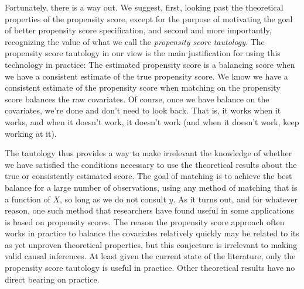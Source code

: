 \documentclass[11pt,titlepage]{article}
\begin{document}
Fortunately, there is a way out.  We suggest, first, looking past the
theoretical properties of the propensity score, except for the purpose
of motivating the goal of better propensity score specification, and
second and more importantly, recognizing the value of what we call the
\emph{propensity score tautology}.  The propensity score tautology in
our view is the main justification for using this technology in
practice: The estimated propensity score is a balancing score when we
have a consistent estimate of the true propensity score.  We know we
have a consistent estimate of the propensity score when matching on
the propensity score balances the raw covariates.  Of course, once we
have balance on the covariates, we're done and don't need to look
back.  That is, it works when it works, and when it doesn't work, it
doesn't work (and when it doesn't work, keep working at it).

The tautology thus provides a way to make irrelevant the knowledge of
whether we have satisfied the conditions necessary to use the
theoretical results about the true or consistently estimated score.
The goal of matching is to achieve the best balance for a large number
of observations, using any method of matching that is a function of
$X$, so long as we do not consult $y$.  As it turns out, and for
whatever reason, one such method that researchers have found useful in
some applications is based on propensity scores.  The reason the
propensity score approach often works in practice to balance the
covariates relatively quickly may be related to its as yet unproven
theoretical properties, but this conjecture is irrelevant to making
valid causal inferences.  At least given the current state of the
literature, only the propensity score tautology is useful in practice.
Other theoretical results have no direct bearing on practice.
\end{document}
